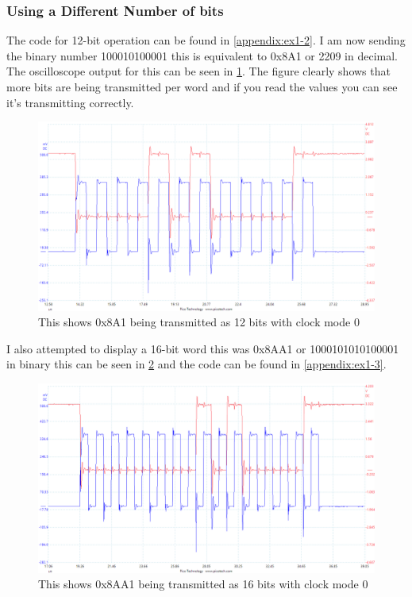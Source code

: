\documentclass[a4paper,12pt]{scrartcl}
\begin{document}
{{			\subsubsection{Using a Different Number of bits}
			{
				The code for 12-bit operation can be found in \cref{appendix:ex1-2}. I am now sending the binary number 100010100001 this is equivalent to 0x8A1 or 2209 in decimal. The oscilloscope output for this can be seen in \cref{img:12bit0x8a1}. The figure clearly shows that more bits are being transmitted per word and if you read the values you can see it's transmitting correctly.
				\begin{figure}[h]
					\centering
					\includegraphics[width=\textwidth]{Ex1/12bit0x8a1}
					\caption{This shows 0x8A1 being transmitted as 12 bits with clock mode 0}
					\label{img:12bit0x8a1}
				\end{figure}
				I also attempted to display a 16-bit word this was 0x8AA1 or 1000101010100001 in binary this can be seen in \cref{img:16bit0x8aa1} and the code can be found in \cref{appendix:ex1-3}.
				\begin{figure}[h]
					\centering
					\includegraphics[width=\textwidth]{Ex1/16bit0x8aa1}
					\caption{This shows 0x8AA1 being transmitted as 16 bits with clock mode 0}
					\label{img:16bit0x8aa1}
				\end{figure}
			}
		}
}
\end{document}

